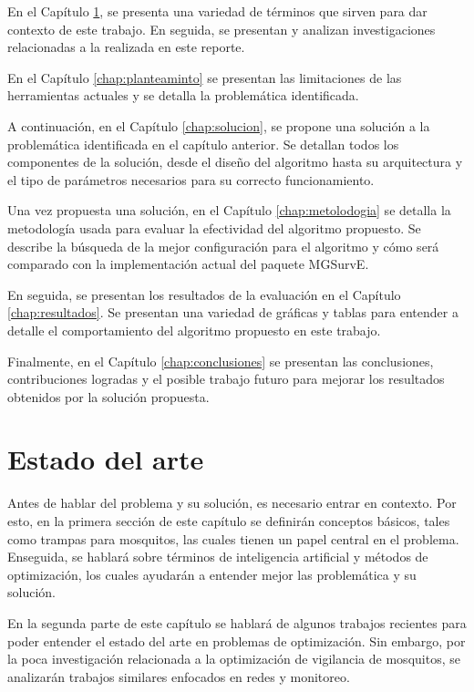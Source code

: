 \documentclass[letterpaper]{report}
\begin{document}
  En el Capítulo \ref{chap:estado-del-arte}, se presenta una variedad de
  términos que sirven para dar contexto de este trabajo. En seguida, se
  presentan y analizan investigaciones relacionadas a la realizada en este
  reporte.

  En el Capítulo \ref{chap:planteaminto} se presentan las limitaciones de las
  herramientas actuales y se detalla la problemática identificada.

  A continuación, en el Capítulo \ref{chap:solucion}, se propone una solución
  a la problemática identificada en el capítulo anterior. Se detallan todos los
  componentes de la solución, desde el diseño del algoritmo hasta su
  arquitectura y el tipo de parámetros necesarios para su correcto
  funcionamiento.

  Una vez propuesta una solución, en el Capítulo \ref{chap:metolodogia} se
  detalla la metodología usada para evaluar la efectividad del algoritmo
  propuesto. Se describe la búsqueda de la mejor configuración para el algoritmo
  y cómo será comparado con la implementación actual del paquete MGSurvE.

  En seguida, se presentan los resultados de la evaluación en el Capítulo
  \ref{chap:resultados}. Se presentan una variedad de gráficas y tablas para
  entender a detalle el comportamiento del algoritmo propuesto en este trabajo.

  Finalmente, en el Capítulo \ref{chap:conclusiones} se presentan las
  conclusiones, contribuciones logradas y el posible trabajo futuro para mejorar
  los resultados obtenidos por la solución propuesta.

\chapter{Estado del arte}\label{chap:estado-del-arte}
  Antes de hablar del problema y su solución, es necesario entrar en contexto.
  Por esto, en la primera sección de este capítulo se definirán conceptos
  básicos, tales como trampas para mosquitos, las cuales tienen un papel central
  en el problema. Enseguida, se hablará sobre términos de inteligencia
  artificial y métodos de optimización, los cuales ayudarán a entender mejor las
  problemática y su solución.
  
  En la segunda parte de este capítulo se hablará de algunos trabajos recientes
  para poder entender el estado del arte en problemas de optimización. Sin
  embargo, por la poca investigación relacionada a la optimización de vigilancia
  de mosquitos, se analizarán trabajos similares enfocados en redes y
  monitoreo.
\end{document}
